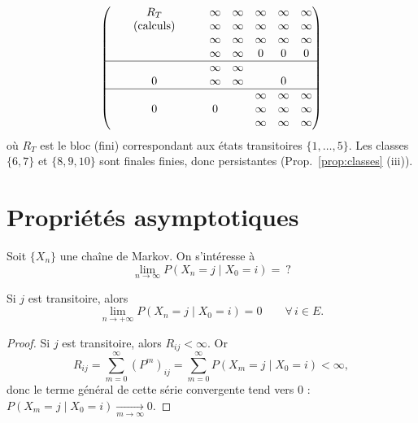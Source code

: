 \begin{exemple}[graphe de la chaîne de Markov sur Moodle, $E = \{1, \dots, 10\}$]
\[\begin{pmatrix}
 & & R_T & & & \infty & \infty & \infty & \infty & \infty \\
 & & \text{(calculs)} & & & \infty & \infty & \infty & \infty & \infty \\
 & & & & & \infty & \infty & \infty & \infty & \infty \\
 & & & & & \infty & \infty & 0 & 0 & 0 \\
\hline
 & & & & & \infty & \infty & & & \\
 & & 0 & & & \infty & \infty & & 0 & \\
\hline
 & & & & & & & \infty & \infty & \infty \\
 & & 0 & & & 0 & & \infty & \infty & \infty \\
 & & & & & & & \infty & \infty & \infty
\end{pmatrix}
\]
où $R_T$ est le bloc (fini) correspondant aux états transitoires $\{1, \dots, 5\}$.
Les classes $\{6, 7\}$ et $\{8, 9, 10\}$ sont finales finies, donc persistantes (Prop.~\ref{prop:classes} (iii)).
\end{exemple}

\section{Propriétés asymptotiques}

Soit $\{X_n\}$ une chaîne de Markov. On s'intéresse à
\[
\lim_{n \to \infty} P(X_n = j \mid X_0 = i) = \ ?
\]

\begin{proposition}
Si $j$ est transitoire, alors
\[
\lim_{n \to +\infty} P(X_n = j \mid X_0 = i) = 0 \qquad \forall\, i \in E .
\]
\end{proposition}

\begin{proof}
Si $j$ est transitoire, alors $R_{ij} < \infty$. Or
\[
R_{ij} = \sum_{m=0}^{\infty} (P^m)_{ij} = \sum_{m=0}^{\infty} P(X_m = j \mid X_0 = i) < \infty ,
\]
donc le terme général de cette série convergente tend vers $0$ :
$P(X_m = j \mid X_0 = i) \xrightarrow[m \to \infty]{} 0$.
\end{proof}

